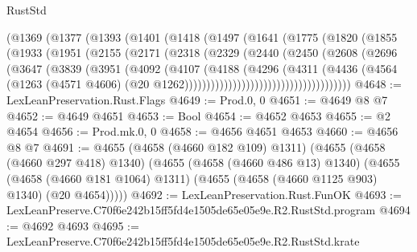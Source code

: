 \begin{lexlean}{RustStd}
\begin{coremodule}
                (@1369
                  (@1377
                    (@1393
                      (@1401
                        (@1418
                          (@1497
                            (@1641
                              (@1775
                                (@1820
                                  (@1855
                                    (@1933
                                      (@1951
                                        (@2155
                                          (@2171
                                            (@2318
                                              (@2329
                                                (@2440
                                                  (@2450
                                                    (@2608
                                                      (@2696
                                                        (@3647
                                                          (@3839
                                                            (@3951
                                                              (@4092
                                                                (@4107
                                                                  (@4188
                                                                    (@4296
                                                                      (@4311
                                                                        (@4436
                                                                          (@4564
                                                                            (@1263
                                                                              (@4571 @4606)
                                                                              (@20
                                                                                @1262))))))))))))))))))))))))))))))))))))))
@4648 := LexLeanPreservation.Rust.Flags
@4649 := Prod.{0, 0}
@4651 := @4649 @8 @7
@4652 := @4649 @4651
@4653 := Bool
@4654 := @4652 @4653
@4655 := @2 @4654
@4656 := Prod.mk.{0, 0}
@4658 := @4656 @4651 @4653
@4660 := @4656 @8 @7
@4691 := @4655
    (@4658 (@4660 @182 @109) @1311)
    (@4655
      (@4658 (@4660 @297 @418) @1340)
      (@4655
        (@4658 (@4660 @486 @13) @1340)
        (@4655
          (@4658 (@4660 @181 @1064) @1311)
          (@4655 (@4658 (@4660 @1125 @903) @1340) (@20 @4654)))))
@4692 := LexLeanPreservation.Rust.FunOK
@4693 := LexLeanPreserve.C70f6e242b15ff5fd4e1505de65e05e9e.R2.RustStd.program
@4694 := @4692 @4693
@4695 := LexLeanPreserve.C70f6e242b15ff5fd4e1505de65e05e9e.R2.RustStd.krate

\end{coremodule}
\end{lexlean}
